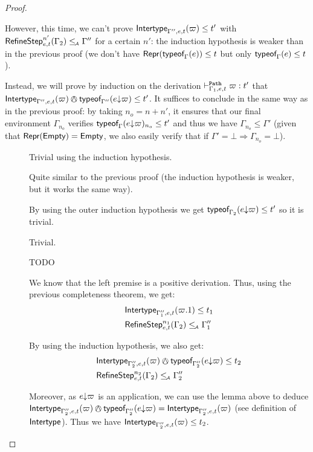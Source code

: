 \documentclass[a4paper]{article}
\theoremstyle{definition}
\begin{document}
\begin{proof}
\begin{description}
      However, this time, we can't prove $\textsf{Intertype}_{\Gamma'',e,t} (\varpi) \leq t'$ with $\textsf{RefineStep}_{e,t}^{n'} (\Gamma_2) \leq_{\!\scriptscriptstyle\mathcal{A}} \Gamma''$
      for a certain $n'$: the induction hypothesis is weaker than in the previous proof
      (we don't have $\textsf{Repr}(\textsf{typeof}_{\Gamma}(e)) \leq t$ but only $\textsf{typeof}_{\Gamma}(e) \leq t$).
      
      Instead, we will prove by induction on the derivation $\vdash^{\texttt{Path}}_{\Gamma_1,e,t} \varpi:t'$ that
      $\env {\Gamma'',e,t} (\varpi) \tsand \tyof {\occ e \varpi} {\Gamma''} \leq t'$.
      It suffices to conclude in the same way as in the previous proof:
      by taking $n_o = n+n'$,
      it ensures that our final environment $\Gamma_{n_o}$ verifies $\textsf{typeof}_{\Gamma}(e{\downarrow}\varpi)_{n_o} \leq t'$
      and thus we have $\Gamma_{n_o} \leq \Gamma'$
      (given that $\textsf{Repr}(\textsf{Empty}) = \textsf{Empty}$, we also easily verify that if $\Gamma' = \bot \Rightarrow \Gamma_{n_o}=\bot$).

      \begin{description}
        \item[] Trivial using the induction hypothesis.
        \item[] Quite similar to the previous proof (the induction hypothesis is weaker, but it works the same way).
        \item[] By using the outer induction hypothesis we get $\textsf{typeof}_{\Gamma_2}(e{\downarrow}\varpi) \leq t'$ so it is trivial.
        \item[] Trivial.
        \item[] TODO
        \item[] We know that the left premise is a positive derivation.
        Thus, using the previous completeness theorem, we get:
        \begin{align*}
          &\textsf{Intertype}_{\Gamma_1'',e,t} (\varpi.1) \leq t_1\\
          &\textsf{RefineStep}_{e,t}^{n_1} (\Gamma_2) \leq_{\!\scriptscriptstyle\mathcal{A}} \Gamma_1''
        \end{align*}

        By using the induction hypothesis, we also get:
        \begin{align*}
          &\env {\Gamma_2'',e,t} (\varpi) \tsand \tyof {\occ e {\varpi}} {\Gamma_2''} \leq t_2\\
          &\RefineStep {e,t}^{n_2} (\Gamma_2) \leqA \Gamma_2''
        \end{align*}

        Moreover, as $e{\downarrow}\varpi$ is an application, we can use the lemma above to deduce
        $\env {\Gamma_2'',e,t} (\varpi) \tsand \tyof {\occ e {\varpi}} {\Gamma_2''} = \env {\Gamma_2'',e,t} (\varpi)$
        (see definition of $\textsf{Intertype}_{}$).
        Thus we have $\textsf{Intertype}_{\Gamma_2'',e,t} (\varpi) \leq t_2$.


\end{description}
\end{description}
\end{proof}
\end{document}
